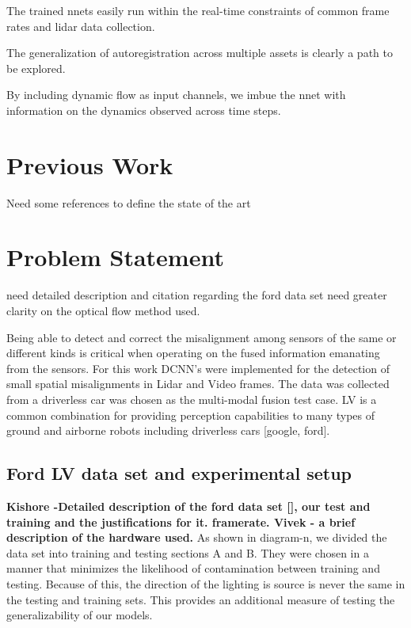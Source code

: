 \documentclass{article}
\begin{document}
The trained nnets easily run within the real-time constraints of common frame rates and lidar data collection. 

The generalization of autoregistration across multiple assets is clearly a path to be explored. 

By including dynamic flow as input channels, we imbue the nnet with information on the dynamics observed across time steps. 


\section{Previous Work}
Need some references to define the state of the art 

\section{Problem Statement}
need detailed description and citation regarding the ford data set
need greater clarity on the optical flow method used. 

Being able to detect and correct the misalignment among sensors of the same or different kinds is critical when operating on the fused information emanating from the sensors. For this work DCNN's were implemented for the detection of small spatial misalignments in Lidar and Video frames. The data was collected from a driverless car was chosen as the multi-modal fusion test case. LV is a common combination for providing perception capabilities to many types of ground and airborne robots including driverless cars [google, ford]. 

\subsection{Ford LV data set and experimental setup}
\textbf{ Kishore -Detailed description of the ford data set [], our test and training and the justifications for it. framerate. 
Vivek - a brief description of the hardware used. }
As shown in diagram-n, we divided the data set into training and testing sections A and B. They were chosen in a manner that minimizes the likelihood of contamination between training and testing. Because of this, the direction of the lighting is source is never the same in the testing and training sets. This provides an additional measure of testing the generalizability of our models. 
\end{document}
